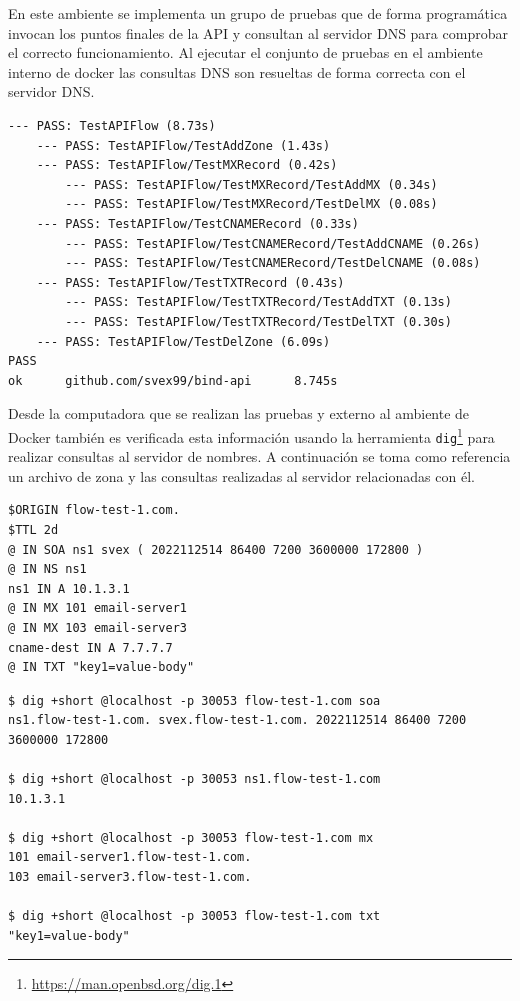 En este ambiente se implementa un grupo de pruebas que de forma programática invocan los puntos finales de la API y consultan al servidor DNS para comprobar el correcto funcionamiento. Al ejecutar el conjunto de pruebas en el ambiente interno de docker las consultas DNS son resueltas de forma correcta con el servidor DNS. 

\begin{lstlisting}[frame=single, numbers=none, caption=Resultados del conjunto de pruebas end-to-end.]
--- PASS: TestAPIFlow (8.73s)
    --- PASS: TestAPIFlow/TestAddZone (1.43s)
    --- PASS: TestAPIFlow/TestMXRecord (0.42s)
        --- PASS: TestAPIFlow/TestMXRecord/TestAddMX (0.34s)
        --- PASS: TestAPIFlow/TestMXRecord/TestDelMX (0.08s)
    --- PASS: TestAPIFlow/TestCNAMERecord (0.33s)
        --- PASS: TestAPIFlow/TestCNAMERecord/TestAddCNAME (0.26s)
        --- PASS: TestAPIFlow/TestCNAMERecord/TestDelCNAME (0.08s)
    --- PASS: TestAPIFlow/TestTXTRecord (0.43s)
        --- PASS: TestAPIFlow/TestTXTRecord/TestAddTXT (0.13s)
        --- PASS: TestAPIFlow/TestTXTRecord/TestDelTXT (0.30s)
    --- PASS: TestAPIFlow/TestDelZone (6.09s)
PASS
ok      github.com/svex99/bind-api      8.745s
\end{lstlisting}

Desde la computadora que se realizan las pruebas y externo al ambiente de Docker también es verificada esta información usando la herramienta \verb|dig|\footnote{\url{https://man.openbsd.org/dig.1}} para realizar consultas al servidor de nombres. A continuación se toma como referencia un archivo de zona y las consultas realizadas al servidor relacionadas con él.

\begin{lstlisting}[frame=single, numbers=none, caption=Archivo de registros para la zona \textbf{flow-test-1.com} servida por el servidor de BIND 9.]
$ORIGIN flow-test-1.com.
$TTL 2d
@ IN SOA ns1 svex ( 2022112514 86400 7200 3600000 172800 )
@ IN NS ns1
ns1 IN A 10.1.3.1
@ IN MX 101 email-server1
@ IN MX 103 email-server3
cname-dest IN A 7.7.7.7
@ IN TXT "key1=value-body"
\end{lstlisting}

\begin{lstlisting}[frame=single, numbers=none, caption=Consulta externas realizadas al servidor para la zona \textbf{flow-test-1.com}.]
$ dig +short @localhost -p 30053 flow-test-1.com soa
ns1.flow-test-1.com. svex.flow-test-1.com. 2022112514 86400 7200 3600000 172800

$ dig +short @localhost -p 30053 ns1.flow-test-1.com
10.1.3.1

$ dig +short @localhost -p 30053 flow-test-1.com mx 
101 email-server1.flow-test-1.com.
103 email-server3.flow-test-1.com.

$ dig +short @localhost -p 30053 flow-test-1.com txt 
"key1=value-body"
\end{lstlisting}

